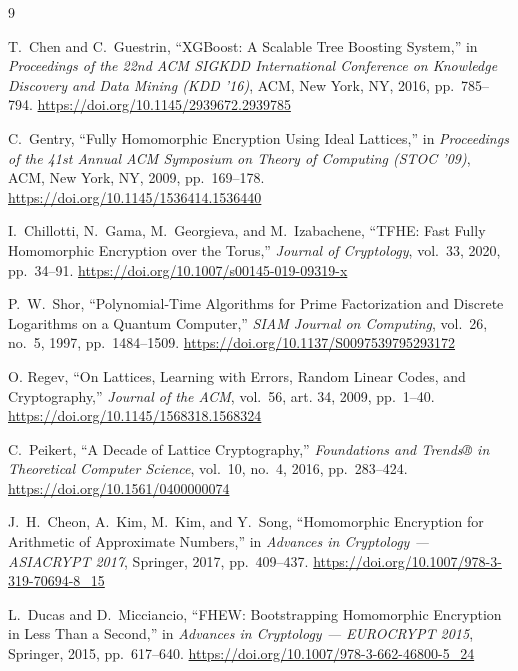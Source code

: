\documentclass[12pt]{article}
\begin{document}

\begin{thebibliography}{9}

T.\ Chen and C.\ Guestrin,
``XGBoost: A Scalable Tree Boosting System,''
in \textit{Proceedings of the 22nd ACM SIGKDD International Conference on
Knowledge Discovery and Data Mining (KDD '16)},
ACM, New York, NY, 2016, pp.\ 785--794.
\url{https://doi.org/10.1145/2939672.2939785}

C.\ Gentry,
``Fully Homomorphic Encryption Using Ideal Lattices,''
in \textit{Proceedings of the 41st Annual ACM Symposium on Theory of Computing
(STOC '09)},
ACM, New York, NY, 2009, pp.\ 169--178.
\url{https://doi.org/10.1145/1536414.1536440}

I.\ Chillotti, N.\ Gama, M.\ Georgieva, and M.\ Izabachene,
``TFHE: Fast Fully Homomorphic Encryption over the Torus,''
\textit{Journal of Cryptology}, vol.\ 33, 2020, pp.\ 34--91.
\url{https://doi.org/10.1007/s00145-019-09319-x}

P.\ W.\ Shor,
``Polynomial-Time Algorithms for Prime Factorization and Discrete Logarithms on a Quantum Computer,''
\textit{SIAM Journal on Computing}, vol.\ 26, no.\ 5, 1997, pp.\ 1484--1509.
\url{https://doi.org/10.1137/S0097539795293172}

O. Regev,
``On Lattices, Learning with Errors, Random Linear Codes, and Cryptography,''
\textit{Journal of the ACM}, vol.\ 56, art. 34, 2009, pp.\ 1--40.
\url{https://doi.org/10.1145/1568318.1568324}

C.\ Peikert,
``A Decade of Lattice Cryptography,''
\textit{Foundations and Trends® in Theoretical Computer Science},
vol.\ 10, no.\ 4, 2016, pp.\ 283--424.
\url{https://doi.org/10.1561/0400000074}

J.\ H.\ Cheon, A.\ Kim, M.\ Kim, and Y.\ Song,
``Homomorphic Encryption for Arithmetic of Approximate Numbers,''
in \textit{Advances in Cryptology --- ASIACRYPT 2017},
Springer, 2017, pp.\ 409--437.
\url{https://doi.org/10.1007/978-3-319-70694-8_15}

L.\ Ducas and D.\ Micciancio,
``FHEW: Bootstrapping Homomorphic Encryption in Less Than a Second,''
in \textit{Advances in Cryptology --- EUROCRYPT 2015},
Springer, 2015, pp.\ 617--640.
\url{https://doi.org/10.1007/978-3-662-46800-5_24}


\end{thebibliography}
\end{document}
